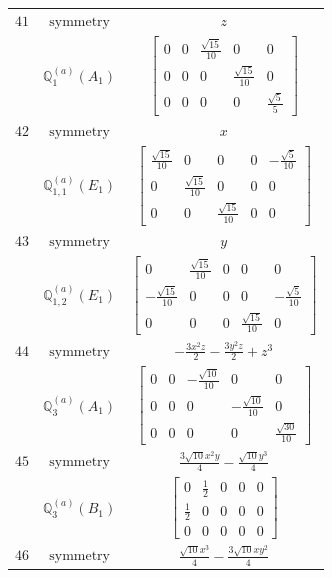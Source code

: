\documentclass[fleqn,8pt,landscape]{jsarticle}
\begin{document}
\begin{longtable}{ccc}
$ 41 $ & $ \text{symmetry} $ & $ z $ \\
$  $ & $ \mathbb{Q}_{1}^{(a)}(A_{1}) $ & $ \begin{bmatrix} 0 & 0 & \frac{\sqrt{15}}{10} & 0 & 0 \\ 0 & 0 & 0 & \frac{\sqrt{15}}{10} & 0 \\ 0 & 0 & 0 & 0 & \frac{\sqrt{5}}{5} \end{bmatrix} $ \\ \hline
$ 42 $ & $ \text{symmetry} $ & $ x $ \\
$  $ & $ \mathbb{Q}_{1,1}^{(a)}(E_{1}) $ & $ \begin{bmatrix} \frac{\sqrt{15}}{10} & 0 & 0 & 0 & - \frac{\sqrt{5}}{10} \\ 0 & \frac{\sqrt{15}}{10} & 0 & 0 & 0 \\ 0 & 0 & \frac{\sqrt{15}}{10} & 0 & 0 \end{bmatrix} $ \\ \hline
$ 43 $ & $ \text{symmetry} $ & $ y $ \\
$  $ & $ \mathbb{Q}_{1,2}^{(a)}(E_{1}) $ & $ \begin{bmatrix} 0 & \frac{\sqrt{15}}{10} & 0 & 0 & 0 \\ - \frac{\sqrt{15}}{10} & 0 & 0 & 0 & - \frac{\sqrt{5}}{10} \\ 0 & 0 & 0 & \frac{\sqrt{15}}{10} & 0 \end{bmatrix} $ \\ \hline
$ 44 $ & $ \text{symmetry} $ & $ - \frac{3 x^{2} z}{2} - \frac{3 y^{2} z}{2} + z^{3} $ \\
$  $ & $ \mathbb{Q}_{3}^{(a)}(A_{1}) $ & $ \begin{bmatrix} 0 & 0 & - \frac{\sqrt{10}}{10} & 0 & 0 \\ 0 & 0 & 0 & - \frac{\sqrt{10}}{10} & 0 \\ 0 & 0 & 0 & 0 & \frac{\sqrt{30}}{10} \end{bmatrix} $ \\ \hline
$ 45 $ & $ \text{symmetry} $ & $ \frac{3 \sqrt{10} x^{2} y}{4} - \frac{\sqrt{10} y^{3}}{4} $ \\
$  $ & $ \mathbb{Q}_{3}^{(a)}(B_{1}) $ & $ \begin{bmatrix} 0 & \frac{1}{2} & 0 & 0 & 0 \\ \frac{1}{2} & 0 & 0 & 0 & 0 \\ 0 & 0 & 0 & 0 & 0 \end{bmatrix} $ \\ \hline
$ 46 $ & $ \text{symmetry} $ & $ \frac{\sqrt{10} x^{3}}{4} - \frac{3 \sqrt{10} x y^{2}}{4} $ \\

\end{longtable}
\end{document}
